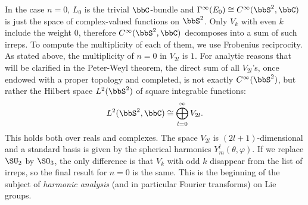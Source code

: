 \begin{example}
    In the case $n=0$, $L_0$ is the trivial $\bbC$-bundle and $\Gamma^\infty(E_0)\cong C^\infty(\bbS^2,\bbC)$ is just the space of complex-valued functions on $\bbS^2$. Only $V_k$ with even $k$ include the weight $0$, therefore $C^\infty(\bbS^2,\bbC)$ decomposes into a sum of such irreps. To compute the multiplicity of each of them, we use Frobenius reciprocity. As stated above, the multiplicity of $n=0$ in $V_{2l}$ is $1$. For analytic reasons that will be clarified in the Peter-Weyl theorem, the direct sum of all $V_{2l}$'s, once endowed with a proper topology and completed, is not exactly $C^\infty(\bbS^2)$, but rather the Hilbert space $L^2(\bbS^2)$ of square integrable functions:
    \[L^2(\bbS^2,\bbC)\cong \bigoplus_{l=0}^\infty V_{2l}.\]
    This holds both over reals and complexes. The space $V_{2l}$ is $(2l+1)$-dimensional and a standard basis is given by the spherical harmonics $Y^l_m(\theta,\varphi)$. If we replace $\SU_2$ by $\SO_3$, the only difference is that $V_k$ with odd $k$ disappear from the list of irreps, so the final result for $n=0$ is the same. This is the beginning of the subject of \emph{harmonic analysis} (and in particular Fourier transforms) on Lie groups.
\end{example}








